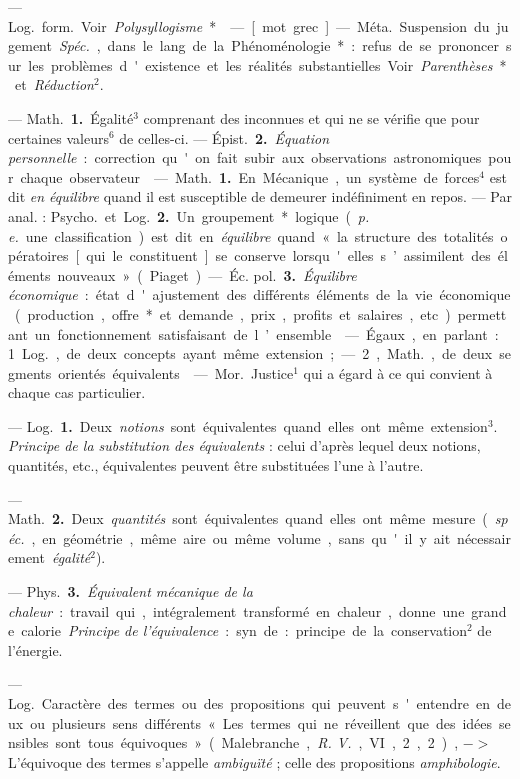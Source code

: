 \begin{itemize}[leftmargin=1cm, label=, itemsep=1pt]
 — \si{Log.} \si{form.} Voir
{\it Polysyllogisme}*.

 — [mot grec] — \si{Méta.} Suspension du jugement.
{\it Spéc.}, dans le lang. de la Phénoménologie* : refus
de se prononcer sur les problèmes d'existence et les réalités
substantielles. Voir {\it Parenthèses}* et {\it Réduction}$^2$.

 — \si{Math.} {\bf 1.} Égalité$^3$ comprenant des
inconnues et qui ne se vérifie que pour certaines valeurs$^6$
de celles-ci. — \si{Épist.} {\bf 2.} {\it Équation
personnelle} : correction qu'on fait
subir aux observations astronomiques pour chaque observateur.

 — \si{Math.} {\bf 1.} En Mécanique,
un système de forces$^4$ est dit {\it en équilibre}
quand il est susceptible de demeurer indéfiniment en repos.
— Par anal. : \si{Psycho.} et \si{Log.} {\bf 2.} Un
groupement* logique ({\it p. e.} une classification) est dit en
{\it équilibre} quand « la structure des totalités opératoires
[qui le constituent] se conserve lorsqu'elles s’assimilent des
éléments nouveaux » (Piaget).
— \si{Éc. pol.} {\bf 3.} {\it Équilibre économique} :
état d'ajustement des différents éléments de la vie économique
(production, offre* et demande, prix, profits et salaires, etc.)
permettant un fonctionnement satisfaisant de l’ensemble.

 — Égaux, en parlant :
1. \si{Log.}, de deux concepts ayant
même extension ; — 2, \si{Math.}, de
deux segments orientés équivalents.

 — \si{Mor.} Justice$^1$ qui a égard
à ce qui convient à chaque cas particulier.

 — \si{Log.} {\bf 1.} Deux {\it notions}
sont équivalentes quand elles ont
même extension$^3$. {\it Principe de la
substitution des équivalents} : celui
d’après lequel deux notions, quantités, etc., équivalentes peuvent être
substituées l’une à l’autre.

— \si{Math.} {\bf 2.} Deux {\it quantités} sont
équivalentes quand elles ont même
mesure ({\it spéc.}, en géométrie, même
aire ou même volume, sans qu'il y
ait nécessairement {\it égalité}$^2$).

— \si{Phys.} {\bf 3.} {\it Équivalent mécanique de la
chaleur} : travail qui, intégralement transformé en chaleur, donne
une grande calorie. {\it Principe de
l’équivalence} : syn. de : principe de
la conservation$^2$ de l’énergie.

 — \si{Log.} Caractère des
termes ou des propositions qui peuvent s'entendre en deux ou plusieurs
sens différents « Les termes qui ne
réveillent que des idées sensibles
sont tous équivoques » (Malebranche, {\it R. V.}, VI, 2, 2), $->$
L'équivoque des termes s'appelle
{\it ambiguïté} ; celle des propositions
{\it amphibologie}.


\end{itemize}
